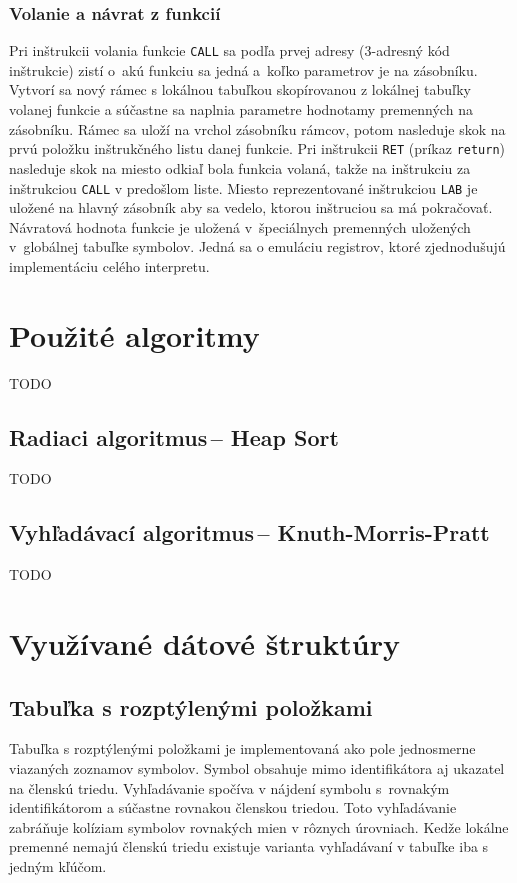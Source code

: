 \documentclass[11pt,a4paper]{article}
\begin{document}
       \subsubsection{Volanie a návrat z funkcií}
       \label{funkcia}
       Pri inštrukcii volania funkcie \texttt{CALL} sa podľa prvej adresy (3-adresný kód inštrukcie) zistí o~akú funkciu sa jedná
       a~koľko parametrov je na zásobníku.
       Vytvorí sa nový rámec s lokálnou tabuľkou skopírovanou z lokálnej tabuľky volanej funkcie a súčastne sa naplnia parametre
       hodnotamy premenných na zásobníku. Rámec sa uloží na vrchol zásobníku rámcov, potom
       nasleduje skok na prvú položku inštrukčného listu danej funkcie.
       Pri inštrukcii \texttt{RET} (príkaz \texttt{return}) nasleduje skok na miesto odkiaľ bola funkcia volaná, takže na inštrukciu za
       inštrukciou \texttt{CALL} v predošlom liste. Miesto reprezentované inštrukciou \texttt{LAB} je uložené na hlavný zásobník aby sa
       vedelo, ktorou inštruciou sa má pokračovať. Návratová hodnota funkcie je uložená v~špeciálnych premenných uložených v~globálnej
       tabuľke symbolov. Jedná sa o emuláciu registrov, ktoré zjednodušujú implementáciu celého interpretu.

    
    

\section{Použité algoritmy} 
\label{algoritmy}

TODO

    \subsection{Radiaci algoritmus\,-- Heap Sort}
    
    TODO

    \subsection{Vyhľadávací algoritmus\,-- Knuth-Morris-Pratt}
    
    TODO
    
\section{Využívané dátové štruktúry} 
\label{struktury}

        \subsection{Tabuľka s rozptýlenými položkami}
        Tabuľka s rozptýlenými položkami je implementovaná ako pole jednosmerne viazaných zoznamov symbolov. Symbol obsahuje
        mimo identifikátora aj ukazatel na členskú triedu. Vyhľadávanie spočíva v nájdení symbolu s~rovnakým identifikátorom
        a súčastne rovnakou členskou triedou. Toto vyhľadávanie zabráňuje kolíziam symbolov rovnakých mien v rôznych úrovniach.
        Kedže lokálne premenné nemajú členskú triedu existuje varianta vyhľadávaní v tabuľke iba s jedným kľúčom.
\end{document}
